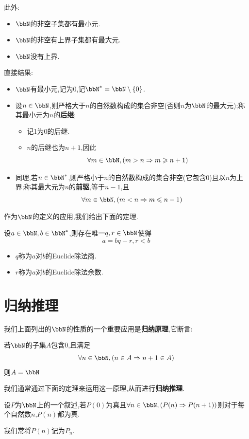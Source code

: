 此外:
\begin{itemize}
    \item $\bbN$的非空子集都有最小元.
    \item $\bbN$的非空有上界子集都有最大元.
    \item $\bbN$没有上界.
\end{itemize}

直接结果:
\begin{itemize}
    \item $\bbN$有最小元,记为0,记$\bbN^* = \bbN \setminus \{ 0 \}$.
    \item 设$n \in \bbN$,则严格大于$n$的自然数构成的集合非空(否则$n$为$\bbN$的最大元);称其最小元为$n$的\textbf{后继};
        \begin{itemize}
            \item 记1为0的后继.
            \item $n$的后继也为$n+1$,因此\[ \forall m \in \bbN, (m > n \Rightarrow m \geqslant n + 1) \]
        \end{itemize}
    \item 同理,若$n \in \bbN^*$,则严格小于$n$的自然数构成的集合非空(它包含0)且以$n$为上界;称其最大元为$n$的\textbf{前驱},等于$n - 1$,且\[ \forall m \in \bbN, (m < n \Rightarrow m \leqslant n - 1) \]
\end{itemize}

作为$\bbN$的定义的应用,我们给出下面的定理.
\begin{thm}[Eucilde除法]
    设$a \in \bbN, b \in \bbN^*$,则存在唯一$q, r \in \bbN$使得\[ a = bq + r, r < b \]
    \begin{itemize}
        \item $q$称为$a$对$b$的Euclide除法商.
        \item $r$称为$a$对$b$的Euclide除法余数.
    \end{itemize}
\end{thm}

\section{归纳推理}

我们上面列出的$\bbN$的性质的一个重要应用是\textbf{归纳原理},它断言:
\begin{thm}[归纳原理]
    若$\bbN$的子集$A$包含0,且满足\[ \forall n \in \bbN, (n \in A \Rightarrow n + 1 \in A) \]则$A = \bbN$
\end{thm}
我们通常通过下面的定理来运用这一原理,从而进行\textbf{归纳推理}.
\begin{thm}
    设$P$为$\bbN$上的一个叙述,若$P(0)$为真且$\forall n \in \bbN, (P(n) \Rightarrow P(n + 1))$则对于每个自然数$n$,$P(n)$都为真.
\end{thm}
\begin{rqq}
    我们常将$P(n)$记为$P_n$.
\end{rqq}

